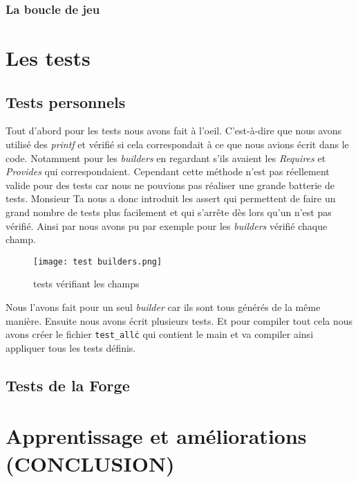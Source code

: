 \documentclass{article}
\begin{document}
\subsubsection{La boucle de jeu}
\newpage
\section{Les tests}

\subsection{Tests personnels}

\vspace{1em}   Tout d'abord pour les tests nous avons fait à l'oeil. C'est-à-dire que nous avons utilisé des \emph{printf} et vérifié si cela correspondait à ce que nous avions écrit dans le code. Notamment pour les \emph{builders} en regardant s'ils avaient les \emph{Requires} et \emph{Provides} qui correspondaient. Cependant cette méthode n'est pas réellement valide pour des tests car nous ne pouvions pas réaliser une grande batterie de tests. Monsieur Ta nous a donc introduit les assert qui permettent de faire un grand nombre de tests plus facilement et qui s'arrête dès lors qu'un n'est pas vérifié. Ainsi par nous avons pu par exemple pour les \emph{builders} vérifié chaque champ. 

\begin{figure}[ht]
    \centering
    \texttt{[image: test builders.png]}
    \caption{tests vérifiant les champs}
    \label{fig:testbuilder}
\end{figure}

\vspace{1cm} Nous l'avons fait pour un seul \emph{builder} car ils sont tous générés de la même manière. Ensuite nous avons écrit plusieurs tests. Et pour compiler tout cela nous avons créer le fichier \texttt{test\_all\.c} qui contient le main et va compiler ainsi appliquer tous les tests définis.


\subsection{Tests de la Forge}

\section{Apprentissage et améliorations (CONCLUSION)}

\vspace{1em}
\end{document}
